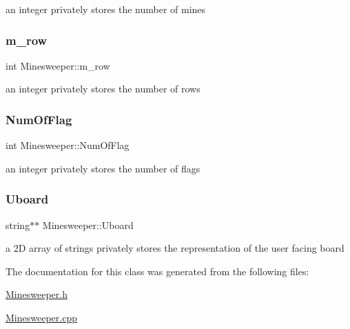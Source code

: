 an integer privately stores the number of mines \mbox{\label{classMinesweeper_a47b1d8996740c300ba320a207833f3ff}} 
\subsubsection{\texorpdfstring{m\+\_\+row}{m\_row}}
{\footnotesize\ttfamily int Minesweeper\+::m\+\_\+row\hspace{0.3cm}{\ttfamily [private]}}

an integer privately stores the number of rows \mbox{\label{classMinesweeper_aa11ba428693510b67f95979f6762b8c6}} 
\subsubsection{\texorpdfstring{Num\+Of\+Flag}{NumOfFlag}}
{\footnotesize\ttfamily int Minesweeper\+::\+Num\+Of\+Flag\hspace{0.3cm}{\ttfamily [private]}}

an integer privately stores the number of flags \mbox{\label{classMinesweeper_ac8e42ed2ff1dccc35d9a9529ffafe9a4}} 
\subsubsection{\texorpdfstring{Uboard}{Uboard}}
{\footnotesize\ttfamily string$\ast$$\ast$ Minesweeper\+::\+Uboard\hspace{0.3cm}{\ttfamily [private]}}

a 2D array of strings privately stores the representation of the user facing board 

The documentation for this class was generated from the following files\+:\begin{DoxyCompactItemize}
\item 
\hyperlink{Minesweeper_8h}{Minesweeper.\+h}\item 
\hyperlink{Minesweeper_8cpp}{Minesweeper.\+cpp}\end{DoxyCompactItemize}
